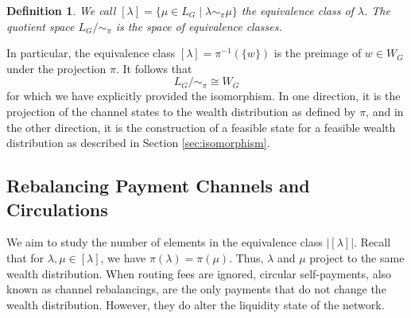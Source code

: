 \documentclass[10pt,twocolumn]{article}
\newtheorem{definition}{Definition}[section]
\begin{document}


\begin{definition}
We call \( [\lambda] = \{\mu \in L_G \mid \lambda \sim_{\pi} \mu\} \) the equivalence class of \( \lambda \).  
The quotient space \( L_G / \sim_{\pi} \) is the space of equivalence classes.
\end{definition}

In particular, the equivalence class \( [\lambda] = \pi^{-1}(\{w\}) \) is the preimage of \( w \in W_G \) under the projection \( \pi \).  
It follows that
\begin{equation}
  L_G / \sim_{\pi} \cong W_G
\end{equation}
for which we have explicitly provided the isomorphism.  
In one direction, it is the projection of the channel states to the wealth distribution as defined by \( \pi \), and in the other direction, it is the construction of a feasible state for a feasible wealth distribution as described in Section \ref{sec:isomorphism}.

\subsection{Rebalancing Payment Channels and Circulations}
\label{sec:rebalancing}

We aim to study the number of elements in the equivalence class \( |[\lambda]| \).  
Recall that for \( \lambda, \mu \in [\lambda] \), we have \( \pi(\lambda) = \pi(\mu) \).  
Thus, \( \lambda \) and \( \mu \) project to the same wealth distribution.  
When routing fees are ignored, circular self-payments, also known as channel rebalancings, are the only payments that do not change the wealth distribution.  
However, they do alter the liquidity state of the network.  
\end{document}
